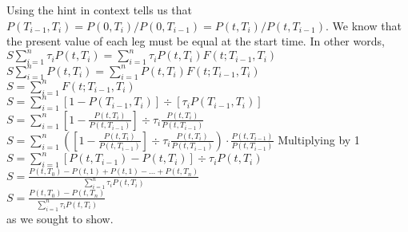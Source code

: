 \documentclass{article}
\begin{document}
{Using the hint in context tells us that $P(T_{i-1}, T_i) = P(0, T_i) / P(0, T_{i-1}) = P(t, T_i) / P(t, T_{i-1})$. We know that the present value of each leg must be equal at the start time. In other words, \\
$S\sum_{i=1}^{n} \tau_i P(t, T_i) = \sum_{i=1}^{n} \tau_i P(t, T_i)F(t; T_{i-1}, T_i)$ \\ 
$S\sum_{i=1}^{n} P(t, T_i) = \sum_{i=1}^{n} P(t, T_i)F(t; T_{i-1}, T_i)$ \\ 
$S = \sum_{i=1}^{n} F(t; T_{i-1}, T_i)$ \\ 
$S = \sum_{i=1}^{n} [1 - P(T_{i-1}, T_i)] \div [\tau_iP(T_{i-1}, T_i)]$ \\ 
$S = \sum_{i=1}^{n} [1 - \frac{P(t, T_i)}{P(t, T_{i-1})}] \div \tau_i \frac{P(t, T_i)}{P(t, T_{i-1})}$ \\ 
$S = \sum_{i=1}^{n} ([1 - \frac{P(t, T_i)}{P(t, T_{i-1})}] \div \tau_i \frac{P(t, T_i)}{P(t, T_{i-1})})\cdot \frac{P(t, T_{i-1})}{P(t, T_{i-1})}$ \hfill Multiplying by 1 \\ 
$S = \sum_{i=1}^{n} [P(t, T_{i-1}) - P(t, T_i)] \div \tau_i P(t, T_i)  $ \\ 
$S = \frac{P(t, T_0) - P(t, 1) + P(t, 1) - \dots + P(t, T_n)}{\sum_{i=1}^{n} \tau_i P(t, T_i)}  $ \\ 
$S = \frac{P(t, T_0) - P(t, T_n)}{\sum_{i=1}^{n} \tau_i P(t, T_i)} $ \\
as we sought to show.

}
\end{document}
